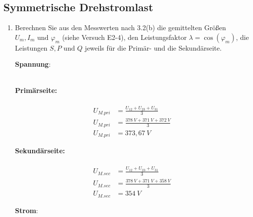 \subsection{Symmetrische Drehstromlast}
\begin{enumerate}[label=\alph*)]

	\item Berechnen Sie aus den Messwerten nach 3.2(b) die gemittelten Größen $U_m, I_m
		      \text{ und } \varphi_m$ (siehe Versuch E2-4), den Leistungsfaktor $\lambda =
		      \cos(\varphi_m)$, die Leistungen $S, P \text{ und } Q$ jeweils für die Primär-
	      und die Sekundärseite.

	      \textbf{Spannung}:\\\ \\
	      \begin{tcolorbox}[colback=gray!30,
			      colframe=black,
			      width=0.9\textwidth,
		      ]
		      \parbox{\textwidth}{

			      \begin{minipage}{0.5\textwidth}
				      \textbf{Primärseite:}\\ \ \\
				      \begin{align*}
					      U_{M.pri} & = \frac{U_{12} + U_{23} + U_{31}}{3} \\
					      U_{M.pri} & = \frac{378\ V + 371\ V + 372\ V}{3} \\
					      U_{M.pri} & = 373,67\ V
				      \end{align*}
			      \end{minipage}\hfill
			      \begin{minipage}{0.5\textwidth}
				      \textbf{Sekundärseite:}\\ \ \\
				      \begin{align*}
					      U_{M.sec} & = \frac{U_{12} + U_{23} + U_{31}}{3} \\
					      U_{M.sec} & = \frac{378\ V + 371\ V + 358\ V}{3} \\
					      U_{M.sec} & = 354\ V
				      \end{align*}
			      \end{minipage}
		      }
	      \end{tcolorbox}

	      \textbf{Strom}:\\\ \\
	      \begin{tcolorbox}[colback=gray!30,
			      colframe=black,
			      width=0.9\textwidth,
		      ]
		      \parbox{\textwidth}{

}
\end{tcolorbox}
\end{enumerate}
